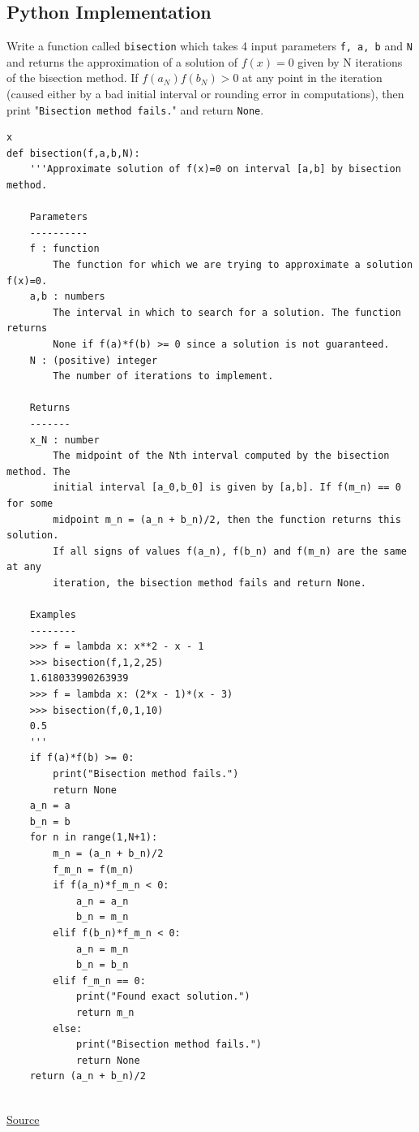 \documentclass[a4paper, 12pt, reqno]{article}
\begin{document}
\subsection{Python Implementation}
Write a function called \texttt{bisection} which takes 4 input parameters \texttt{f, a, b} and \texttt{N} and returns the approximation of a solution of $f(x)=0$ given by N iterations of the bisection method. If  $f(a_N)f(b_N)>0$ at any point in the iteration (caused either by a bad initial interval or rounding error in computations), then print "\texttt{Bisection method fails.}" and return \texttt{None}.
\begin{lstlisting}[frame=single]  % Start your code-block
x
def bisection(f,a,b,N):
    '''Approximate solution of f(x)=0 on interval [a,b] by bisection method.

    Parameters
    ----------
    f : function
        The function for which we are trying to approximate a solution f(x)=0.
    a,b : numbers
        The interval in which to search for a solution. The function returns
        None if f(a)*f(b) >= 0 since a solution is not guaranteed.
    N : (positive) integer
        The number of iterations to implement.

    Returns
    -------
    x_N : number
        The midpoint of the Nth interval computed by the bisection method. The
        initial interval [a_0,b_0] is given by [a,b]. If f(m_n) == 0 for some
        midpoint m_n = (a_n + b_n)/2, then the function returns this solution.
        If all signs of values f(a_n), f(b_n) and f(m_n) are the same at any
        iteration, the bisection method fails and return None.

    Examples
    --------
    >>> f = lambda x: x**2 - x - 1
    >>> bisection(f,1,2,25)
    1.618033990263939
    >>> f = lambda x: (2*x - 1)*(x - 3)
    >>> bisection(f,0,1,10)
    0.5
    '''
    if f(a)*f(b) >= 0:
        print("Bisection method fails.")
        return None
    a_n = a
    b_n = b
    for n in range(1,N+1):
        m_n = (a_n + b_n)/2
        f_m_n = f(m_n)
        if f(a_n)*f_m_n < 0:
            a_n = a_n
            b_n = m_n
        elif f(b_n)*f_m_n < 0:
            a_n = m_n
            b_n = b_n
        elif f_m_n == 0:
            print("Found exact solution.")
            return m_n
        else:
            print("Bisection method fails.")
            return None
    return (a_n + b_n)/2


\end{lstlisting}

\href{https://personal.math.ubc.ca/~pwalls/math-python/roots-optimization/bisection/}{Source}
\end{document}
